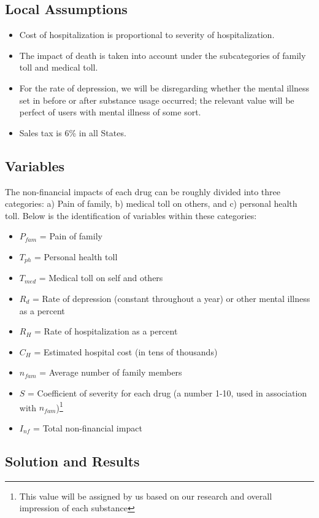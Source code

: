 \documentclass[12pt,letterpaper]{article}
\begin{document}
\subsection{Local Assumptions}
\begin{itemize}
  \item Cost of hospitalization is proportional to severity of hospitalization.
  \item The impact of death is taken into account under the subcategories of family toll and medical toll.
  \item For the rate of depression, we will be disregarding whether the mental illness set in before or after substance usage occurred; the relevant value will be perfect of users with mental illness of some sort.
  \item Sales tax is 6\% in all States.
\end{itemize}

\subsection{Variables}
The non-financial impacts of each drug can be roughly divided into three categories: a) Pain of family, b) medical toll on others, and c) personal health toll. Below is the identification of variables within these categories:

\begin{itemize}[label=]
  \item $P_{fam}$ = Pain of family
  \item $T_{ph}$ = Personal health toll
  \item $T_{med}$ = Medical toll on self and others
  \item $R_d$ = Rate of depression (constant throughout a year) or other mental illness as a percent
  \item $R_H$ = Rate of hospitalization as a percent
  \item $C_H$ = Estimated hospital cost (in tens of thousands)
  \item $n_{fam}$ = Average number of family members
  \item $S$ = Coefficient of severity for each drug (a number 1-10, used in association with $n_{fam}$)\footnote{This value will be assigned by us based on our research and overall impression of each substance}
  \item $I_{nf}$ = Total non-financial impact
\end{itemize}

\subsection{Solution and Results}
\end{document}
